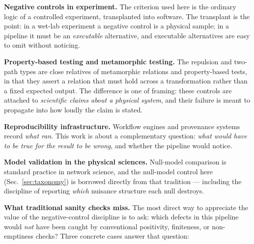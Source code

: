 \documentclass[11pt,a4paper]{article}
\begin{document}
\textbf{Negative controls in experiment.} The criterion used here is the ordinary
logic of a controlled experiment, transplanted into software. The transplant is the
point: in a wet-lab experiment a negative control is a physical sample; in a
pipeline it must be an \emph{executable} alternative, and executable alternatives
are easy to omit without noticing.

\textbf{Property-based testing and metamorphic testing.} The repulsion and two-path
types are close relatives of metamorphic relations and property-based tests, in that
they assert a relation that must hold across a transformation rather than a fixed
expected output. The difference is one of framing: these controls are attached to
\emph{scientific claims about a physical system}, and their failure is meant to
propagate into how loudly the claim is stated.

\textbf{Reproducibility infrastructure.} Workflow engines and provenance systems
record \emph{what ran}. This work is about a complementary question: \emph{what
would have to be true for the result to be wrong}, and whether the pipeline would
notice.

\textbf{Model validation in the physical sciences.} Null-model comparison is
standard practice in network science, and the null-model control here
(Sec.~\ref{sec:taxonomy}) is borrowed directly from that tradition --- including the
discipline of reporting \emph{which} nuisance structure each null destroys.

\textbf{What traditional sanity checks miss.} The most direct way to appreciate
the value of the negative-control discipline is to ask: which defects in this
pipeline would \emph{not} have been caught by conventional positivity,
finiteness, or non-emptiness checks? Three concrete cases answer that question:
\end{document}
